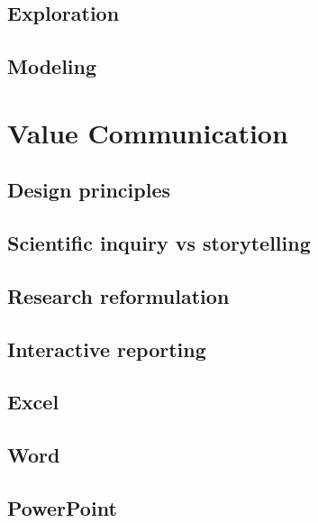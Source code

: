 \documentclass[
]{book}
\begin{document}
\hypertarget{exploration}{%
\section{Exploration}\label{exploration}}

\hypertarget{modeling}{%
\section{Modeling}\label{modeling}}

\hypertarget{value-communication}{%
\chapter{Value Communication}\label{value-communication}}

\hypertarget{design-principles}{%
\section{Design principles}\label{design-principles}}

\hypertarget{scientific-inquiry-vs-storytelling}{%
\section{Scientific inquiry vs storytelling}\label{scientific-inquiry-vs-storytelling}}

\hypertarget{research-reformulation}{%
\section{Research reformulation}\label{research-reformulation}}

\hypertarget{interactive-reporting}{%
\section{Interactive reporting}\label{interactive-reporting}}

\hypertarget{excel}{%
\section{Excel}\label{excel}}

\hypertarget{word}{%
\section{Word}\label{word}}

\hypertarget{powerpoint}{%
\section{PowerPoint}\label{powerpoint}}
\end{document}
